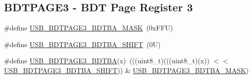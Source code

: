 \subsection*{B\+D\+T\+P\+A\+G\+E3 -\/ B\+DT Page Register 3}
\begin{DoxyCompactItemize}
\item 
\#define \mbox{\hyperlink{group___u_s_b___register___masks_ga9081479345a744c85a74643600921b64}{U\+S\+B\+\_\+\+B\+D\+T\+P\+A\+G\+E3\+\_\+\+B\+D\+T\+B\+A\+\_\+\+M\+A\+SK}}~(0x\+F\+F\+U)
\item 
\#define \mbox{\hyperlink{group___u_s_b___register___masks_ga9850caac94013a6e84f9af9cbe0e0827}{U\+S\+B\+\_\+\+B\+D\+T\+P\+A\+G\+E3\+\_\+\+B\+D\+T\+B\+A\+\_\+\+S\+H\+I\+FT}}~(0\+U)
\item 
\#define \mbox{\hyperlink{group___u_s_b___register___masks_ga1576cadd83c016ae56239b96238ffeb8}{U\+S\+B\+\_\+\+B\+D\+T\+P\+A\+G\+E3\+\_\+\+B\+D\+T\+BA}}(x)~(((uint8\+\_\+t)(((uint8\+\_\+t)(x)) $<$$<$ \mbox{\hyperlink{group___u_s_b___register___masks_ga9850caac94013a6e84f9af9cbe0e0827}{U\+S\+B\+\_\+\+B\+D\+T\+P\+A\+G\+E3\+\_\+\+B\+D\+T\+B\+A\+\_\+\+S\+H\+I\+FT}})) \& \mbox{\hyperlink{group___u_s_b___register___masks_ga9081479345a744c85a74643600921b64}{U\+S\+B\+\_\+\+B\+D\+T\+P\+A\+G\+E3\+\_\+\+B\+D\+T\+B\+A\+\_\+\+M\+A\+SK}})
\end{DoxyCompactItemize}
